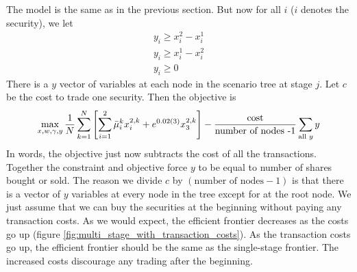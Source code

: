 \documentclass{amsart}
\theoremstyle{definition}
\theoremstyle{remark}
\begin{document}
The model is the same as in the previous section. But now for all $i$ ($i$ denotes the security), we let
\begin{align*}
y_i \ge x_i^{2} - x_i^1\\
y_i  \ge x_i^{1} - x_i^{2}\\
y_i \ge 0
\end{align*}
There is a $y$ vector of variables at each node in the scenario tree at stage $j$. Let $c$ be the cost to trade one security. Then the objective is
\begin{equation*}
\max_{x,w,\gamma,y} \frac{1}{N}\sum_{k=1}^N\left[\sum_{i=1}^2 \bar{\mu}^k_i x^{2,k}_i +  e^{0.02(3)} x_3^{2,k}\right] - \frac{\text{cost}}{\text{number of nodes -1}}\sum_{\text{all } y} y\\
\end{equation*}
In words, the objective just now subtracts the cost of all the transactions. Together the constraint and objective  force $y$ to be equal to number of shares bought or sold. The reason we divide $c$ by $(\text{number of nodes}- 1)$ is that there is a vector of $y$ variables at every node in the tree except for at the root node. We just assume that we can buy the securities at the beginning without paying any transaction costs. As we would expect, the efficient frontier decreases as the costs go up (figure \ref{fig:multi_stage_with_transaction_costs}). As the transaction costs go up, the efficient frontier should be the same as the single-stage frontier. The increased costs discourage any trading after the beginning.



\end{document}
